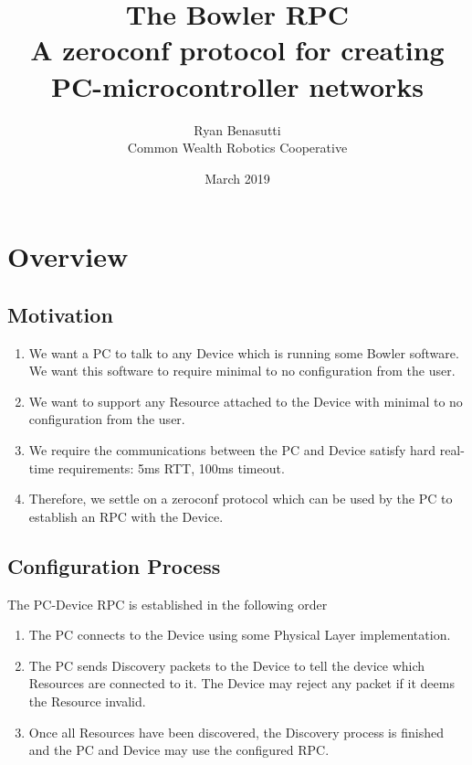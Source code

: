 \documentclass{article}
\title{
    The Bowler RPC \\
    \large A zeroconf protocol for creating PC-microcontroller networks
}
\author{Ryan Benasutti \\ Common Wealth Robotics Cooperative}
\date{March 2019}
\begin{document}
\maketitle

\section{Overview}

\subsection{Motivation}

\begin{enumerate}
    \item We want a PC to talk to any Device which is running some Bowler software. We want
    this software to require minimal to no configuration from the user.
    
    \item We want to support any Resource attached to the Device with minimal to no configuration
    from the user.

    \item We require the communications between the PC and Device satisfy hard real-time
    requirements: 5ms RTT, 100ms timeout.

    \item Therefore, we settle on a zeroconf protocol which can be used by the PC to establish
    an RPC with the Device.
\end{enumerate}

\subsection{Configuration Process}

The PC-Device RPC is established in the following order
\begin{enumerate}
    \item The PC connects to the Device using some Physical Layer implementation.
    \item The PC sends Discovery packets to the Device to tell the device which Resources are
    connected to it. The Device may reject any packet if it deems the Resource invalid.
    \item Once all Resources have been discovered, the Discovery process is finished and the
    PC and Device may use the configured RPC.
\end{enumerate}
\end{document}
